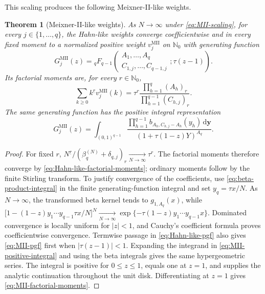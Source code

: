 \documentclass[10pt]{amsart}
\newcommand{\Nzero}{\mathbb N_0}
\newcommand{\dd}{\,\mathrm d}
\newcommand{\abs}[1]{\lvert#1\rvert}
\newcommand{\fall}[2]{#1^{\underline{#2}}}
\newcommand{\pFq}[5]{{}_{#1}F_{#2}\!\left(\begin{matrix}#3\\#4\end{matrix};#5\right)}
\theoremstyle{plain}
\newtheorem{theorem}{Theorem}[section]
\theoremstyle{definition}
\theoremstyle{remark}
\begin{document}
This scaling produces the following Meixner-II-like weights.

\begin{theorem}[Meixner-II-like weights]
\label{thm:MII-rows}
As \(N\to\infty\) under \eqref{eq:MII-scaling}, for every
\(j\in\{1,\ldots,q\}\), the Hahn-like weights converge coefficientwise
and in every fixed moment to a normalized positive weight
\(v_j^{\mathrm{MII}}\) on \(\Nzero\) with generating function
\begin{equation}
 G_j^{\mathrm{MII}}(z)
 =\pFq{q}{q-1}{A_1,\ldots,A_q}
 {C_{1,j},\ldots,C_{q-1,j}}{\tau(z-1)}.
 \label{eq:MII-pgf}
\end{equation}
Its factorial moments are, for every \(r\in\Nzero\),
\begin{equation}
 \sum_{k\ge0}\fall{k}{r}v_j^{\mathrm{MII}}(k)
 =\tau^r\frac{\prod_{h=1}^q(A_h)_r}
 {\prod_{h=1}^{q-1}(C_{h,j})_r}.
 \label{eq:MII-factorial-moments}
\end{equation}
The same generating function has the positive integral representation
\begin{equation}
 G_j^{\mathrm{MII}}(z)
 =\int_{(0,1)^{q-1}}
 \frac{\prod_{h=1}^{q-1}b_{A_h,C_{h,j}-A_h}(y_h)
       \dd\boldsymbol y}
 {(1+\tau(1-z)Y)^{A_q}}.
 \label{eq:MII-positive-integral}
\end{equation}
\end{theorem}

\begin{proof}
For fixed \(r\),
\(\fall{N}{r}/(\beta_q^{(N)}+\delta_{q,j})_r
\xrightarrow[N\to\infty]{}\tau^r\).
The factorial moments therefore converge by
\eqref{eq:Hahn-like-factorial-moments}; ordinary moments follow by the
finite Stirling transform. To justify convergence of the coefficients,
use \eqref{eq:beta-product-integral} in the finite generating-function
integral and set \(y_q=\tau x/N\). As \(N\to\infty\), the transformed beta
kernel tends to \(g_{1,A_q}(x)\), while
\(\bigl[1-(1-z)y_1\cdots y_{q-1}\tau x/N\bigr]^N
\xrightarrow[N\to\infty]{}
\exp\{-\tau(1-z)y_1\cdots y_{q-1}x\}\).
Dominated convergence is locally uniform for \(\abs z<1\), and Cauchy's
coefficient formula proves coefficientwise convergence. Termwise passage
in \eqref{eq:Hahn-like-pgf} also gives \eqref{eq:MII-pgf} first when
\(\abs{\tau(z-1)}<1\). Expanding the integrand in
\eqref{eq:MII-positive-integral} and using the beta integrals gives the
same hypergeometric series. The integral is positive for \(0\le z\le1\),
equals one at \(z=1\), and supplies the analytic continuation throughout
the unit disk. Differentiating at \(z=1\) gives
\eqref{eq:MII-factorial-moments}.
\end{proof}
\end{document}
